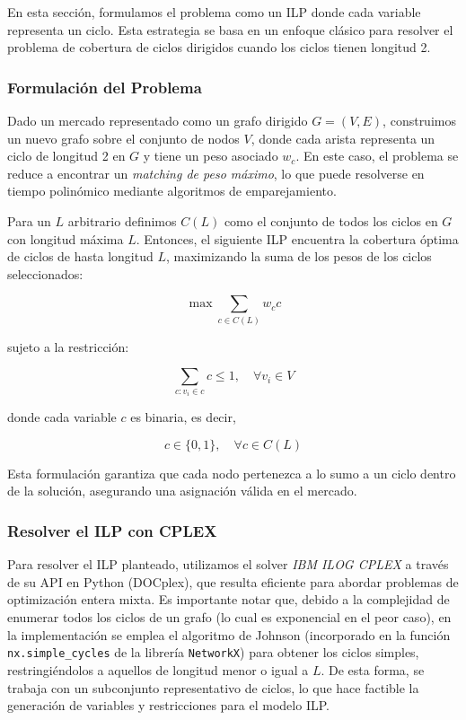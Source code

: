 \documentclass[twocolumn, fontsize=10pt]{article}
\begin{document}
En esta sección, formulamos el problema como un ILP donde cada variable representa un ciclo. Esta estrategia se basa en un enfoque clásico para resolver el problema de cobertura de ciclos dirigidos cuando los ciclos tienen longitud 2.

\subsubsection{Formulación del Problema}

Dado un mercado representado como un grafo dirigido \( G = (V, E) \), construimos un nuevo grafo sobre el conjunto de nodos \( V \), donde cada arista representa un ciclo de longitud 2 en \( G \) y tiene un peso asociado \( w_c \). En este caso, el problema se reduce a encontrar un \textit{matching de peso máximo}, lo que puede resolverse en tiempo polinómico mediante algoritmos de emparejamiento.

Para un \( L \) arbitrario definimos \( C(L) \) como el conjunto de todos los ciclos en \( G \) con longitud máxima \( L \). Entonces, el siguiente ILP encuentra la cobertura óptima de ciclos de hasta longitud \( L \), maximizando la suma de los pesos de los ciclos seleccionados:

\begin{equation}
\max \sum_{c \in C(L)} w_c c
\end{equation}

sujeto a la restricción:

\begin{equation}
\sum_{c: v_i \in c} c \leq 1, \quad \forall v_i \in V
\end{equation}

donde cada variable \( c \) es binaria, es decir,

\begin{equation}
c \in \{0,1\}, \quad \forall c \in C(L)
\end{equation}

Esta formulación garantiza que cada nodo pertenezca a lo sumo a un ciclo dentro de la solución, asegurando una asignación válida en el mercado.

\subsubsection{Resolver el ILP con CPLEX}

Para resolver el ILP planteado, utilizamos el solver \textit{IBM ILOG CPLEX} a través de su API en Python (DOCplex), que resulta eficiente para abordar problemas de optimización entera mixta. Es importante notar que, debido a la complejidad de enumerar todos los ciclos de un grafo (lo cual es exponencial en el peor caso), en la implementación se emplea el algoritmo de Johnson (incorporado en la función \texttt{nx.simple\_cycles} de la librería \texttt{NetworkX}) para obtener los ciclos simples, restringiéndolos a aquellos de longitud menor o igual a \(L\). De esta forma, se trabaja con un subconjunto representativo de ciclos, lo que hace factible la generación de variables y restricciones para el modelo ILP.
\end{document}
